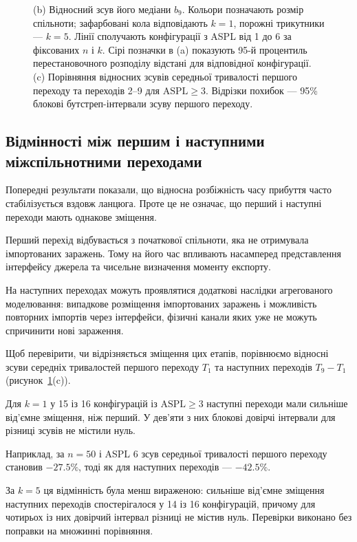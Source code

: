\begin{figure}[tbp]
{(b) Відносний зсув його медіани $b_9$.
Кольори позначають розмір спільноти;
зафарбовані кола відповідають $k=1$,
порожні трикутники --- $k=5$.
Лінії сполучають конфігурації
з ASPL від 1 до 6 за фіксованих
$n$ і $k$. Сірі позначки в (a)
показують 95-й процентиль
перестановочного розподілу
відстані для відповідної конфігурації.
(c) Порівняння відносних зсувів
середньої тривалості першого
переходу та переходів 2--9
для $\mathrm{ASPL}\geq3$.
Відрізки похибок --- 95\%
блокові бутстреп-інтервали
зсуву першого переходу.
}
\label{fig:descriptor}
\end{figure}


\subsection{Відмінності між першим
і наступними міжспільнотними переходами}

Попередні результати показали,
що відносна розбіжність часу
прибуття часто стабілізується
вздовж ланцюга.
Проте це не означає,
що перший і наступні переходи
мають однакове зміщення.

Перший перехід відбувається
з початкової спільноти,
яка не отримувала імпортованих
заражень. Тому на його час
впливають насамперед
представлення інтерфейсу
джерела та чисельне
визначення моменту експорту.

На наступних переходах
можуть проявлятися
додаткові наслідки
агрегованого моделювання:
випадкове розміщення
імпортованих заражень
і можливість повторних
імпортів через інтерфейси,
фізичні канали яких
уже не можуть спричинити
нові зараження.

Щоб перевірити, чи відрізняється
зміщення цих етапів,
порівнюємо відносні зсуви
середніх тривалостей
першого переходу $T_1$
та наступних переходів
$T_9-T_1$
(рисунок~\ref{fig:descriptor}(c)).

Для $k=1$ у 15 із 16
конфігурацій із
$\mathrm{ASPL}\geq3$
наступні переходи мали
сильніше від'ємне зміщення,
ніж перший.
У дев'яти з них
блокові довірчі інтервали
для різниці зсувів
не містили нуль.

Наприклад, за $n=50$
і ASPL 6 зсув середньої
тривалості першого переходу
становив $-27.5\%$,
тоді як для наступних
переходів --- $-42.5\%$.

За $k=5$ ця відмінність
була менш вираженою:
сильніше від'ємне
зміщення наступних
переходів спостерігалося
у 14 із 16 конфігурацій,
причому для чотирьох
із них довірчий інтервал
різниці не містив нуль.
Перевірки виконано
без поправки на множинні
порівняння.

